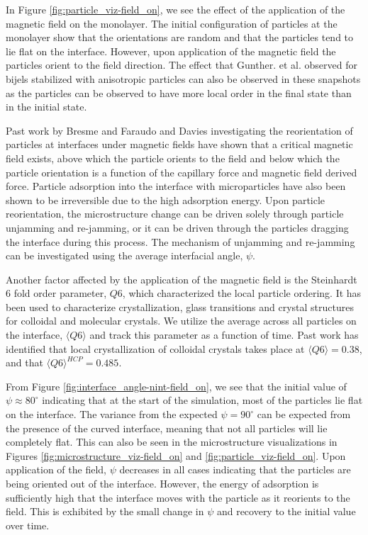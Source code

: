 In Figure \ref{fig:particle_viz-field_on}, we see the effect of the application of the magnetic field on the monolayer. 
The initial configuration of particles at the monolayer show that the orientations are random and that the particles 
tend to lie flat on the interface. However, upon application of the magnetic field the particles orient to the field 
direction. The effect that Gunther. et al. observed for bijels stabilized with anisotropic particles can also be 
observed in these snapshots as the particles can be observed to have more local order in the final state than in 
the initial state. 

Past work by Bresme and Faraudo and Davies investigating the reorientation of particles at interfaces under magnetic 
fields have shown that a critical magnetic field exists, above which the particle orients to the field and below 
which the particle orientation is a function of the capillary force and magnetic field derived force. 
\cite{davies_interface_2014, bresme_orientational_2007} Particle adsorption into the interface with microparticles have 
also been shown to be irreversible due to the high adsorption energy. Upon particle reorientation, the microstructure 
change can be driven solely through particle unjamming and re-jamming, or it can be driven through the particles dragging 
the interface during this process. The mechanism of unjamming and re-jamming can be investigated using the average 
interfacial angle, $\psi$.

Another factor affected by the application of the magnetic field is the Steinhardt 6 fold order parameter, $Q6$, 
which characterized the local particle ordering. \cite{steinhardt_bond-orientational_1983} It has been used to 
characterize crystallization, glass transitions and crystal structures for colloidal and molecular crystals. 
We utilize the average across all particles on the interface, $\langle Q6 \rangle$ and track this parameter 
as a function of time. Past work has identified that local crystallization of colloidal crystals takes place 
at $\langle Q6 \rangle = 0.38$, and that $\langle Q6 \rangle^{HCP} = 0.485$. 
\cite{steinhardt_bond-orientational_1983, toxvaerd_role_2020, mickel_shortcomings_2013}

From Figure \ref{fig:interface_angle-nint-field_on}, we see that the initial value of $\psi \approx 80 ^{\circ}$ 
indicating that at the start of the simulation, most of the particles lie flat on the interface. The variance from 
the expected $\psi = 90 ^{\circ}$ can be expected from the presence of the curved interface, meaning that not all 
particles will lie completely flat. This can also be seen in the microstructure visualizations in Figures 
\ref{fig:microstructure_viz-field_on} and \ref{fig:particle_viz-field_on}. Upon application of the field, 
$\psi$ decreases in all cases indicating that the particles are being oriented out of the interface. 
However, the energy of adsorption is sufficiently high that the interface moves with the particle as it 
reorients to the field. This is exhibited by the small change in $\psi$ and recovery to the initial value over time.

